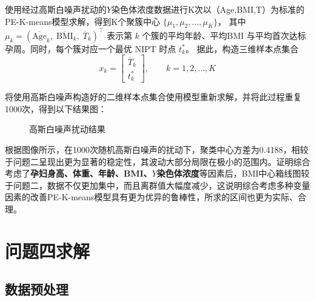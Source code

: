 \documentclass[12pt]{ctexart}
\begin{document}
	使用经过高斯白噪声扰动的$Y$染色体浓度数据进行K次以（Age,BMI,T）为标准的PE-K-means模型求解，得到K个聚簇中心 $\{\mu_1,\mu_2,\dots,\mu_K\}$，
	其中 $\mu_k=(\overline{\mathrm{Age}}_k,\;\overline{\mathrm{BMI}}_k,\; \overline{T}_k)^\top$ 表示第 $k$ 个簇的平均年龄、平均BMI
	与平均首次达标孕周。同时，每个簇对应一个最优 NIPT 时点 $t_k^*$。
	据此，构造三维样本点集合
	\[
	x_k = \begin{bmatrix} \overline{T}_k \\[2pt] t_k^* \end{bmatrix},
	\qquad k=1,2,\dots,K
	\]
	
	将使用高斯白噪声构造好的二维样本点集合使用模型重新求解，并将此过程重复1000次，得到以下结果图：
\begin{figure}[htbp]
	\centering
	\caption{高斯白噪声扰动结果}
\end{figure}
	
	根据图像所示，在1000次随机高斯白噪声的扰动下，聚类中心方差为0.4188，相较于问题二呈现出更为显著的稳定性，其波动大部分局限在极小的范围内。证明综合考虑了\textbf{孕妇身高、体重、年龄、BMI、$Y$染色体浓度}等因素后，BMI中心箱线图较于问题二，数据不仅更加集中，而且离群值大幅度减少，这说明综合考虑多种变量因素的改善PE-K-means模型具有更为优异的鲁棒性，所求的区间也更为实际、合理。
	
	\section{问题四求解}
	
	\subsection{数据预处理}
	
\end{document}
